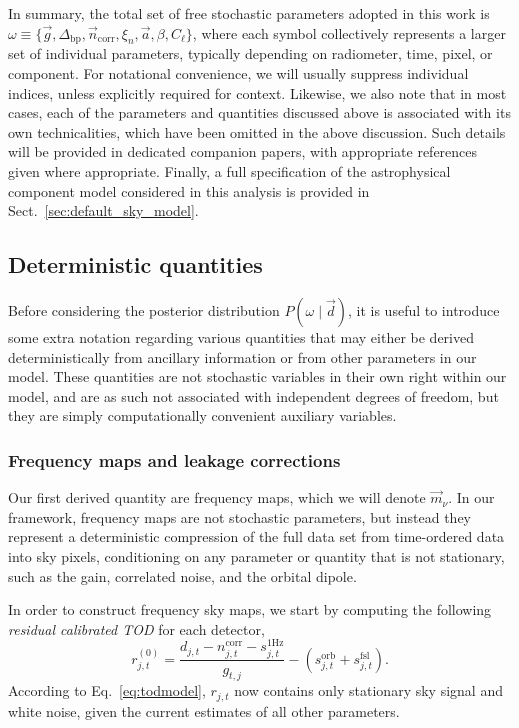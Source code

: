 \documentclass[twocolumn]{aa}
\renewcommand{\d}[0]{\vec{d}}
\newcommand{\n}[0]{\vec{n}}
\renewcommand{\a}[0]{\vec{a}}
\newcommand{\m}[0]{\vec{m}}
\newcommand{\g}[0]{\vec{g}}
\newcommand{\Dbp}[0]{\Delta_{\mathrm{bp}}}
\begin{document}
In summary, the total set of free stochastic parameters adopted in
this work is
$\omega\equiv\{\g,\Dbp,\n_{\mathrm{corr}},\xi_{n},\a,\beta,C_{\ell}\}$,
where each symbol collectively represents a larger set of individual
parameters, typically depending on radiometer, time, pixel, or
component. For notational convenience, we will usually suppress
individual indices, unless explicitly required for context. Likewise,
we also note that in most cases, each of the parameters and quantities
discussed above is associated with its own technicalities, which have
been omitted in the above discussion. Such details will be provided in
dedicated companion papers, with appropriate references given where
appropriate. Finally, a full specification of the astrophysical
component model considered in this analysis is provided in
Sect.~\ref{sec:default_sky_model}.

\subsection{Deterministic quantities}
\label{sec:derquant}

Before considering the posterior distribution $P(\omega\mid \d)$, it is
useful to introduce some extra notation regarding various quantities
that may either be derived deterministically from ancillary
information or from other parameters in our model. These quantities
are not stochastic variables in their own right within our model, and
are as such not associated with independent degrees of freedom, but
they are simply computationally convenient auxiliary variables.

\subsubsection{Frequency maps and leakage corrections}
\label{sec:freqmaps}

Our first derived quantity are frequency maps, which we
will denote $\m_{\nu}$. In our framework, frequency maps are not
stochastic parameters, but instead they represent a deterministic
compression of the full data set from time-ordered data into sky
pixels, conditioning on any parameter or quantity that is not
stationary, such as the gain, correlated noise, and the orbital
dipole.

In order to construct frequency sky maps, we start by computing the
following \emph{residual calibrated TOD} for each detector,
\begin{equation}
  r^{(0)}_{j,t} = \frac{d_{j,t}- n^{\mathrm{corr}}_{j,t}- s^{\mathrm{1Hz}}_{j,t}}{g_{t,j}} - \left(s^{\mathrm{orb}}_{j,t}  
  + s^{\mathrm{fsl}}_{j,t}\right).
  \label{eq:res_bin1}
\end{equation}
According to Eq.~\eqref{eq:todmodel}, $r_{j,t}$ now contains only
stationary sky signal and white noise, given the current estimates of
all other parameters.
\end{document}

